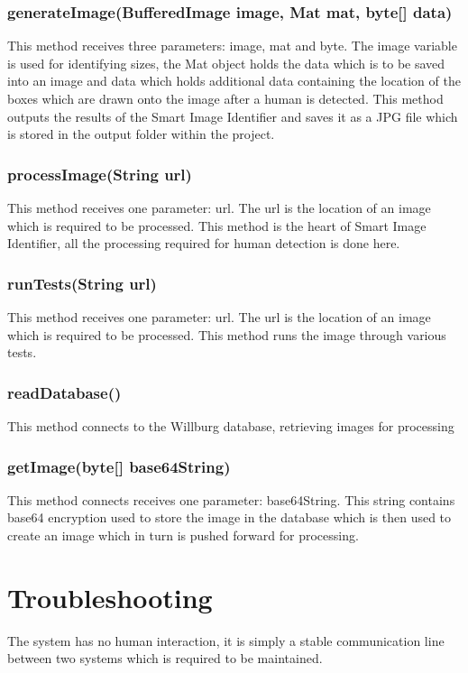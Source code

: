 \documentclass[a4paper,12pt]{report}
\begin{document}
\subsubsection{generateImage(BufferedImage image, Mat mat, byte[] data)}
This method receives three parameters: image, mat and byte. The image variable is used
for identifying sizes, the Mat object holds the data which is to be saved into an image and
data which holds additional data containing the location of the boxes which are drawn
onto the image after a human is detected.
This method outputs the results of the Smart Image Identifier and saves it as a JPG file
which is stored in the output folder within the project.
\subsubsection{processImage(String url)}
This method receives one parameter: url. The url is the location of an image which is
required to be processed.
This method is the heart of Smart Image Identifier, all the processing required for human
detection is done here.
\subsubsection{runTests(String url)}
This method receives one parameter: url. The url is the location of an image which is required to be processed.
This method runs the image through various tests.

\subsubsection{readDatabase()}
This method connects to the Willburg database, retrieving images for processing
\subsubsection{getImage(byte[] base64String)}
This method connects receives one parameter: base64String. This string contains base64 encryption used to store the image in the database which is then used to create an image which in turn is pushed forward for processing.
\pagebreak
\section{Troubleshooting}
The system has no human interaction, it is simply a stable communication line between two systems which is required to be maintained.
\end{document}
